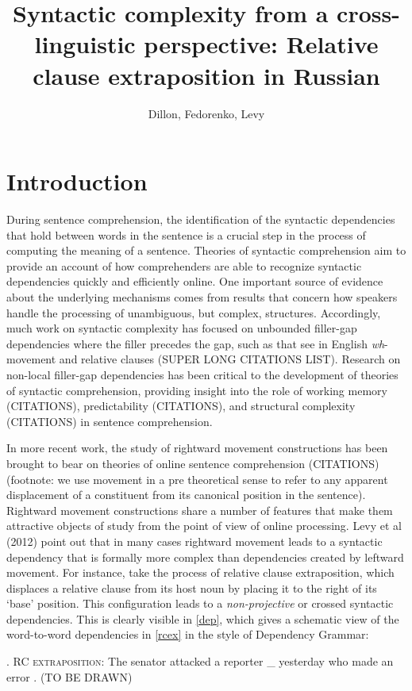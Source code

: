 \documentclass[12pt]{article}
\begin{document}
\title{Syntactic complexity from a cross-linguistic perspective: Relative clause extraposition in Russian}
\author{Dillon, Fedorenko, Levy}

\section{Introduction}
\label{sec:intro}

	During sentence comprehension, the identification of the syntactic dependencies that hold between words in the sentence is a crucial step in the process of computing the meaning of a sentence. Theories of syntactic comprehension aim to provide an account of how comprehenders are able to recognize syntactic dependencies quickly and efficiently online. One important source of evidence about the underlying mechanisms comes from results that concern how speakers handle the processing of unambiguous, but complex, structures. Accordingly, much work on syntactic complexity has focused on unbounded filler-gap dependencies where the filler precedes the gap, such as that see in English \textit{wh}-movement and relative clauses (SUPER LONG CITATIONS LIST). Research on non-local filler-gap dependencies has been critical to the development of theories of syntactic comprehension, providing insight into the role of working memory (CITATIONS), predictability (CITATIONS), and structural complexity (CITATIONS) in sentence comprehension.  
	
	In more recent work, the study of rightward movement constructions has been brought to bear on theories of online sentence comprehension (CITATIONS) (footnote: we use movement in a pre theoretical sense to refer to any apparent displacement of a constituent from its canonical position in the sentence). Rightward movement constructions share a number of features that make them attractive objects of study from the point of view of online processing. Levy et al (2012) point out that in many cases rightward movement leads to a syntactic dependency that is formally more complex than dependencies created by leftward movement. For instance, take the process of relative clause extraposition, which displaces a relative clause from its host noun by placing it to the right of its `base' position. This configuration leads to a \textit{non-projective} or crossed syntactic dependencies. This is clearly visible in \ref{dep}, which gives a schematic view of the word-to-word dependencies in \ref{rcex} in the style of Dependency Grammar:
	
	   	\ex.	\label{rcex} \textsc{RC extraposition}: The senator attacked a reporter \_  yesterday  who made an error . (TO BE DRAWN)
\end{document}
